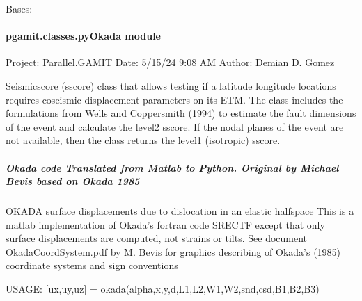 \documentclass[letterpaper,10pt,english]{sphinxmanual}
\begin{document}

\begin{fulllineitems}
\label{\detokenize{pgamit.classes:pgamit.classes.pyOTL.pyOTLException}}
\pysigstartsignatures
\pysiglinewithargsret
{}
{}
{}
\pysigstopsignatures
\sphinxAtStartPar
Bases: 

\end{fulllineitems}



\paragraph{pgamit.classes.pyOkada module}
\label{\detokenize{pgamit.classes:module-pgamit.classes.pyOkada}}\label{\detokenize{pgamit.classes:pgamit-classes-pyokada-module}}
\sphinxAtStartPar
Project: Parallel.GAMIT
Date: 5/15/24 9:08 AM
Author: Demian D. Gomez

\sphinxAtStartPar
Seismic\sphinxhyphen{}score (s\sphinxhyphen{}score) class that allows testing if a latitude longitude locations requires co\sphinxhyphen{}seismic
displacement parameters on its ETM. The class includes the formulations from Wells and Coppersmith (1994) to
estimate the fault dimensions of the event and calculate the level\sphinxhyphen{}2 s\sphinxhyphen{}score. If the nodal planes of the event
are not available, then the class returns the level\sphinxhyphen{}1 (isotropic) s\sphinxhyphen{}score.


\subparagraph{Okada code Translated from Matlab to Python. Original by Michael Bevis based on Okada 1985}
\label{\detokenize{pgamit.classes:okada-code-translated-from-matlab-to-python-original-by-michael-bevis-based-on-okada-1985}}
\sphinxAtStartPar
OKADA surface displacements due to dislocation in an elastic half\sphinxhyphen{}space This is a matlab implementation of Okada’s
fortran code SRECTF except that only surface displacements are computed, not strains or tilts. See document
OkadaCoordSystem.pdf by M. Bevis for graphics describing of Okada’s (1985) coordinate systems and sign conventions

\sphinxAtStartPar
USAGE:    {[}ux,uy,uz{]} = okada(alpha,x,y,d,L1,L2,W1,W2,snd,csd,B1,B2,B3)
\end{document}

